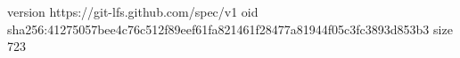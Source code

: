 version https://git-lfs.github.com/spec/v1
oid sha256:41275057bee4c76c512f89eef61fa821461f28477a81944f05c3fc3893d853b3
size 723
